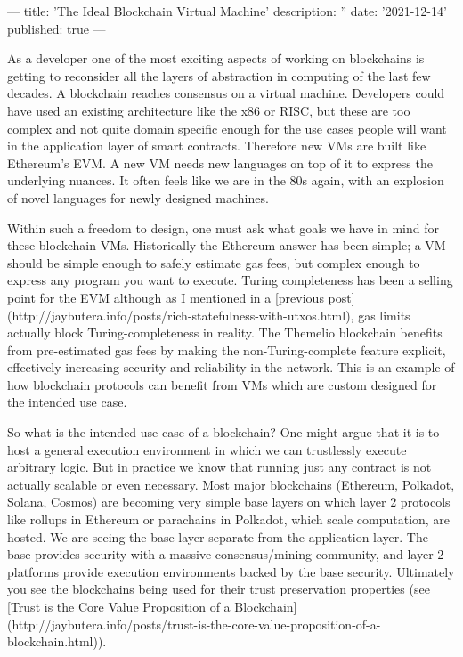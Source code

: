 ---
title: 'The Ideal Blockchain Virtual Machine'
description: ''
date: '2021-12-14'
published: true
---

As a developer one of the most exciting aspects of working on blockchains is getting to reconsider all the layers of abstraction in computing of the last few decades. A blockchain reaches consensus on a virtual machine. Developers could have used an existing architecture like the x86 or RISC, but these are too complex and not quite domain specific enough for the use cases people will want in the application layer of smart contracts. Therefore new VMs are built like Ethereum's EVM. A new VM needs new languages on top of it to express the underlying nuances. It often feels like we are in the 80s again, with an explosion of novel languages for newly designed machines.

Within such a freedom to design, one must ask what goals we have in mind for these blockchain VMs. Historically the Ethereum answer has been simple; a VM should be simple enough to safely estimate gas fees, but complex enough to express any program you want to execute. Turing completeness has been a selling point for the EVM although as I mentioned in a [previous post](http://jaybutera.info/posts/rich-statefulness-with-utxos.html), gas limits actually block Turing-completeness in reality. The Themelio blockchain benefits from pre-estimated gas fees by making the non-Turing-complete feature explicit, effectively increasing security and reliability in the network. This is an example of how blockchain protocols can benefit from VMs which are custom designed for the intended use case.

So what is the intended use case of a blockchain? One might argue that it is to host a general execution environment in which we can trustlessly execute arbitrary logic. But in practice we know that running just any contract is not actually scalable or even necessary. Most major blockchains (Ethereum, Polkadot, Solana, Cosmos) are becoming very simple base layers on which layer 2 protocols like rollups in Ethereum or parachains in Polkadot, which scale computation, are hosted. We are seeing the base layer separate from the application layer. The base provides security with a massive consensus/mining community, and layer 2 platforms provide execution environments backed by the base security. Ultimately you see the blockchains being used for their trust preservation properties (see [Trust is the Core Value Proposition of a Blockchain](http://jaybutera.info/posts/trust-is-the-core-value-proposition-of-a-blockchain.html)).

